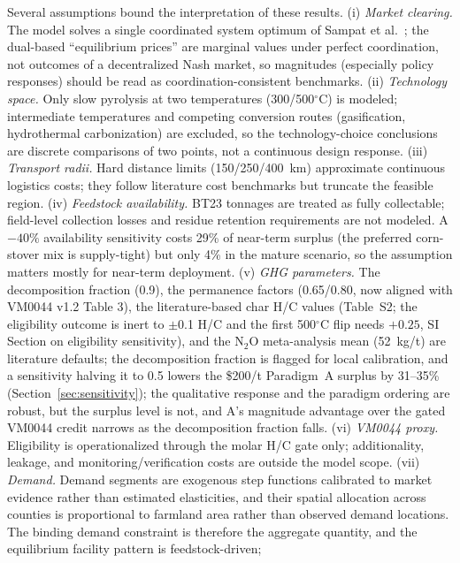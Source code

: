 Several assumptions bound the interpretation of these results. (i)
\emph{Market clearing.} The model solves a single coordinated system optimum
of Sampat et al.~\cite{sampat2019}; the dual-based ``equilibrium prices'' are marginal
values under perfect coordination, not outcomes of a decentralized Nash market,
so magnitudes (especially policy responses) should be read as
coordination-consistent benchmarks. (ii) \emph{Technology space.} Only slow
pyrolysis at two temperatures (300/500$^\circ$C) is modeled; intermediate
temperatures and competing conversion routes (gasification, hydrothermal
carbonization) are excluded, so the technology-choice conclusions are discrete
comparisons of two points, not a continuous design response. (iii)
\emph{Transport radii.} Hard distance limits (150/250/400~km) approximate
continuous logistics costs; they follow literature cost benchmarks but truncate
the feasible region. (iv) \emph{Feedstock availability.} BT23 tonnages are
treated as fully collectable; field-level collection losses and residue
retention requirements are not modeled. A $-40\%$ availability sensitivity
costs 29\% of near-term surplus (the preferred corn-stover mix is
supply-tight) but only 4\% in the mature scenario, so the assumption matters
mostly for near-term deployment.
(v) \emph{GHG parameters.} The decomposition fraction (0.9), the permanence
factors (0.65/0.80, now aligned with VM0044 v1.2 Table 3), the
literature-based char H/C values (Table~S2; the eligibility outcome is inert
to $\pm$0.1 H/C and the first 500$^\circ$C flip needs $+0.25$, SI Section on
eligibility sensitivity), and the N$_2$O
meta-analysis mean (52~kg/t) are literature defaults; the decomposition
fraction is flagged for local calibration, and a sensitivity halving it to
0.5 lowers the \$200/t Paradigm~A surplus by 31--35\%
(Section~\ref{sec:sensitivity}); the
qualitative response and the paradigm ordering are robust, but the surplus
level is not, and A's magnitude advantage over the gated VM0044 credit narrows
as the decomposition fraction falls. (vi) \emph{VM0044 proxy.} Eligibility is
operationalized through the molar H/C gate only; additionality, leakage, and
monitoring/verification costs are outside the model scope. (vii)
\emph{Demand.} Demand segments are exogenous step functions calibrated to
market evidence rather than estimated elasticities, and their spatial
allocation across counties is proportional to farmland area rather than
observed demand locations. The binding demand constraint is therefore the
aggregate quantity, and the equilibrium facility pattern is feedstock-driven;
